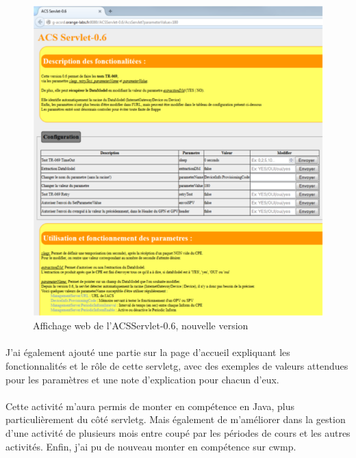 \documentclass[12pt,a4paper]{report}
\begin{document}
\paragraph*{}
\begin{figure}[!ht]
    \center
    \includegraphics[scale=0.74]{./img/acs_servlet_06.png}
    \caption{Affichage web de l’ACSServlet-0.6, nouvelle version}
\end{figure}
\newpage
\paragraph*{}J’ai également ajouté une partie sur la page d'accueil expliquant les fonctionnalités et le rôle de cette \gls{servletg}, avec des exemples de valeurs attendues pour les paramètres et une note d'explication pour chacun d’eux.
\paragraph*{}Cette activité m’aura permis de monter en compétence en Java, plus particulièrement du côté \gls{servletg}. Mais également de m’améliorer dans la gestion d’une activité de plusieurs mois entre coupé par les périodes de cours et les autres activités. Enfin, j’ai pu de nouveau monter en compétence sur \gls{cwmp}. \\
\end{document}
